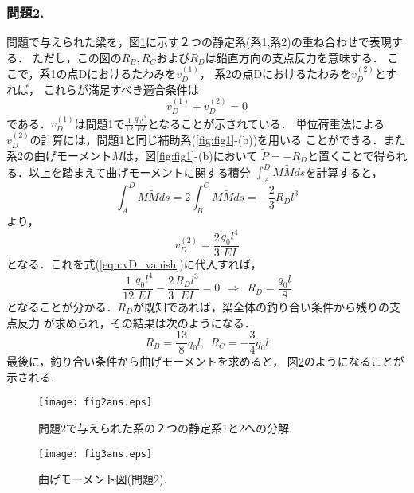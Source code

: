 \documentclass[10pt,a4j]{jarticle}
\begin{document}
\subsubsection*{問題2.}
問題で与えられた梁を，図\ref{fig:fig2}に示す２つの静定系(系1,系2)の重ね合わせで表現する．
ただし，この図の$R_B,R_C$および$R_D$は鉛直方向の支点反力を意味する．
ここで，系1の点Dにおけるたわみを$v^{(1)}_D$，
系2の点Dにおけるたわみを$v^{(2)}_D$とすれば，
これらが満足すべき適合条件は
\begin{equation}
	v^{(1)}_D
	+
	v^{(2)}_D
	=0
	\label{eqn:vD_vanish}
\end{equation}
である．$v_D^{(1)}$は問題1で$\frac{1}{12}\frac{q_0l^4}{EI}$となることが示されている．
単位荷重法による$v^{(2)}_D$の計算には，問題1と同じ補助系(\ref{fig:fig1}-(b))を用いる
ことができる．また系2の曲げモーメント$M$は，図\ref{fig:fig1}-(b)において
$\tilde P=-R_D$と置くことで得られる．以上を踏まえて曲げモーメントに関する積分
$\int_A^DM\tilde M ds $を計算すると，
\begin{equation}
	\int_A^D M\tilde Mds= 2\int_B^CM \tilde Mds=-\frac{2}{3}R_Dl^3
\end{equation}
より，
\begin{equation}
	v_D^{(2)}=\frac{2}{3}\frac{q_0l^4}{EI}
\end{equation}
となる．これを式(\ref{eqn:vD_vanish})に代入すれば，
\begin{equation}
	\frac{1}{12}\frac{q_0l^4}{EI}
	-\frac{2}{3}\frac{R_Dl^3}{EI}
	=0 \ \ \Rightarrow \ \ 
	R_D=\frac{q_0l}{8}
\end{equation}
となることが分かる．$R_D$が既知であれば，梁全体の釣り合い条件から残りの支点反力
が求められ，その結果は次のようになる．
\begin{equation}
	R_B=\frac{13}{8}q_0l, \ \ R_C=-\frac{3}{4}q_0l
\end{equation}
最後に，釣り合い条件から曲げモーメントを求めると，
図\ref{fig:fig3}のようになることが示される.
\begin{figure}
	\vspace{10mm}
	\begin{center}
	\texttt{[image: fig2ans.eps]} 
	\end{center}
	\caption{問題2で与えられた系の２つの静定系1と2への分解. } 
	\label{fig:fig2}
\end{figure}
\begin{figure}
	\vspace{10mm}
	\begin{center}
	\texttt{[image: fig3ans.eps]} 
	\end{center}
	\caption{曲げモーメント図(問題2). } 
	\label{fig:fig3}
\end{figure}
\end{document}
